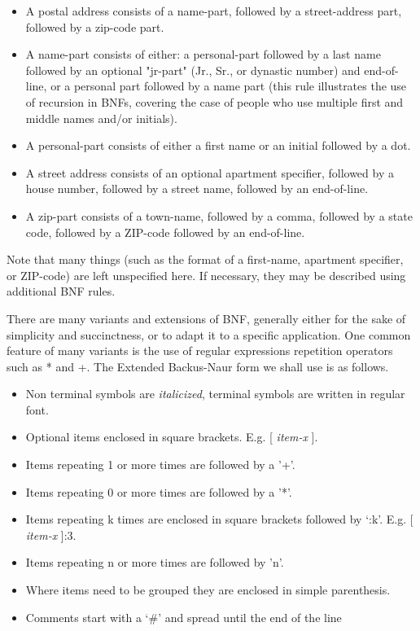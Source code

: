 \documentclass[11pt]{article}
\begin{document}
\begin{itemize}
\item A postal address consists of a name-part, followed by a
street-address part, followed by a zip-code part.

\item A name-part consists of either: a personal-part followed by a last
name followed by an optional "jr-part" (Jr., Sr., or dynastic number)
and end-of-line, or a personal part followed by a name part (this
rule illustrates the use of recursion in BNFs, covering the case of
people who use multiple first and middle names and/or initials).

\item A personal-part consists of either a first name or an initial
followed by a dot.

\item A street address consists of an optional apartment specifier,
followed by a house number, followed by a street name, followed by an
end-of-line.

\item A zip-part consists of a town-name, followed by a comma, followed by
a state code, followed by a ZIP-code followed by an end-of-line.
\end{itemize}

Note that many things (such as the format of a first-name, apartment
specifier, or ZIP-code) are left unspecified here. If necessary, they
may be described using additional BNF rules.

There are many variants and extensions of BNF, generally either for the
sake of simplicity and succinctness, or to adapt it to a specific
application. One common feature of many variants is the use of regular
expressions repetition operators such as * and +. The Extended
Backus-Naur form we shall use is as follows.

\begin{itemize}
\item Non terminal symbols are \emph{italicized}, terminal symbols are written
in regular font.

\item Optional items enclosed in square brackets. E.g. [ \emph{item-x} ].

\item Items repeating 1 or more times are followed by a '+'.

\item Items repeating 0 or more times are followed by a '*'.

\item Items repeating k times are enclosed in square brackets followed by
‘:k'. E.g. [ \emph{item-x} ]:3.

\item Items repeating n or more times are followed by 'n'.

\item Where items need to be grouped they are enclosed in simple
parenthesis.

\item Comments start with a ‘\#' and spread until the end of the line
\end{itemize}
\end{document}
